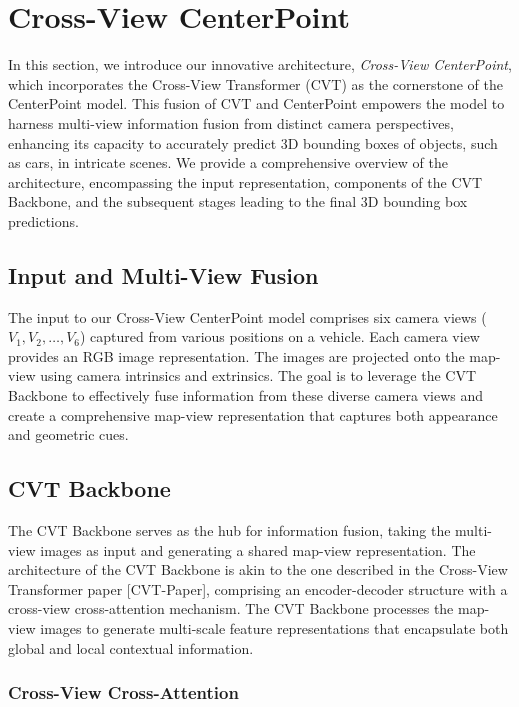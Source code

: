 \documentclass[times, report, parskip, openbib, twocolumn]{article}
\begin{document}
\section{Cross-View CenterPoint}

In this section, we introduce our innovative architecture, \textit{Cross-View CenterPoint}, which incorporates the Cross-View Transformer (CVT) as the cornerstone of the CenterPoint model. This fusion of CVT and CenterPoint empowers the model to harness multi-view information fusion from distinct camera perspectives, enhancing its capacity to accurately predict 3D bounding boxes of objects, such as cars, in intricate scenes. We provide a comprehensive overview of the architecture, encompassing the input representation, components of the CVT Backbone, and the subsequent stages leading to the final 3D bounding box predictions.

\subsection{Input and Multi-View Fusion}

The input to our Cross-View CenterPoint model comprises six camera views (\(V_1, V_2, \ldots, V_6\)) captured from various positions on a vehicle. Each camera view provides an RGB image representation. The images are projected onto the map-view using camera intrinsics and extrinsics. The goal is to leverage the CVT Backbone to effectively fuse information from these diverse camera views and create a comprehensive map-view representation that captures both appearance and geometric cues.

\subsection{CVT Backbone}

The CVT Backbone serves as the hub for information fusion, taking the multi-view images as input and generating a shared map-view representation. The architecture of the CVT Backbone is akin to the one described in the Cross-View Transformer paper [CVT-Paper], comprising an encoder-decoder structure with a cross-view cross-attention mechanism. The CVT Backbone processes the map-view images to generate multi-scale feature representations that encapsulate both global and local contextual information.

\subsubsection{Cross-View Cross-Attention}
\end{document}
